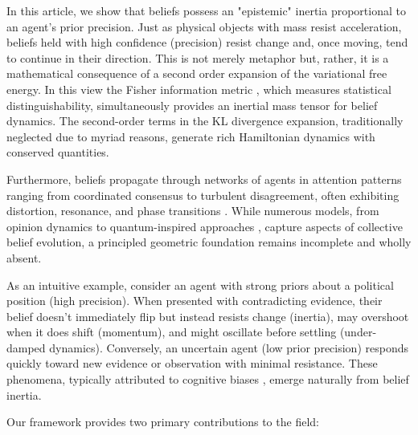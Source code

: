 \documentclass[12pt]{article}
\begin{document}
In this article, we show that beliefs possess an "epistemic" inertia proportional to an agent's prior precision. Just as physical objects with mass resist acceleration, beliefs held with high confidence (precision) resist change and, once moving, tend to continue in their direction. This is not merely metaphor but, rather, it is a mathematical consequence of a second order expansion of the variational free energy. In this view the Fisher information metric \citet{Amari2016}, which measures statistical distinguishability, simultaneously provides an inertial mass tensor for belief dynamics. The second-order terms in the KL divergence expansion, traditionally neglected due to myriad reasons\citet{friston2008hierarchical,bogacz2017tutorial}, generate rich Hamiltonian dynamics with conserved quantities.

Furthermore, beliefs propagate through networks of agents in attention patterns ranging from coordinated consensus to turbulent disagreement, often exhibiting distortion, resonance, and phase transitions \citet{castellano2009statistical,galam2012sociophysics}. While numerous models, from opinion dynamics \citet{hegselmann2002opinion} to quantum-inspired approaches \citet{busemeyer2012quantum}, capture aspects of collective belief evolution, a principled geometric foundation remains incomplete and wholly absent.

As an intuitive example, consider an agent with strong priors about a political position (high precision). When presented with contradicting evidence, their belief doesn't immediately flip but instead resists change (inertia), may overshoot when it does shift (momentum), and might oscillate before settling (under-damped dynamics). Conversely, an uncertain agent (low prior precision) responds quickly toward new evidence or observation with minimal resistance. These phenomena, typically attributed to cognitive biases \citet{kahneman2011thinking}, emerge naturally from belief inertia.

Our framework provides two primary contributions to the field:
\end{document}
